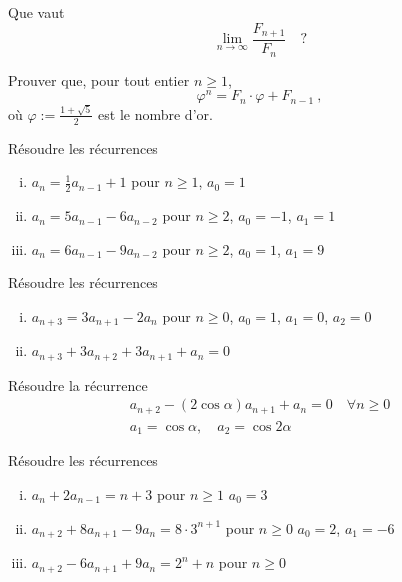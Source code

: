 \begin{exo} 
Que vaut
$$
\lim_{n \to \infty} \frac{F_{n+1}}{F_n} \quad ?
$$
\end{exo}

\begin{exo} 
Prouver que, pour tout entier $n \geqslant 1$, 
$$
\varphi^n = F_n \cdot \varphi + F_{n-1}\ ,
$$
o\`u $\varphi := \frac{1+\sqrt{5}}{2}$ est le {\DEF nombre d'or}.
\end{exo}

\begin{exo}
R\'esoudre les r\'ecurrences 
%
\begin{enumerate}[(i)]
\item $a_n = \frac{1}{2} a_{n-1} + 1$ pour $n \geqslant 1$,\hfill
 $a_0 = 1$

\item $a_n = 5a_{n-1} - 6a_{n-2}$ pour $n \geqslant 2$,\hfill
 $a_0 = -1$, \quad $a_1 = 1$

\item $a_n = 6a_{n-1} - 9a_{n-2}$ pour $n \geqslant 2$,\hfill
 $a_0 = 1$, \quad $a_1 = 9$

\end{enumerate}
\end{exo}

\begin{exo}
R\'esoudre les r\'ecurrences 
%
\begin{enumerate}[(i)]

\item $a_{n+3} = 3 a_{n+1} - 2 a_{n}$ pour $n \geqslant 0$,\hfill
      $a_0 = 1$, \quad $a_1 = 0$, \quad $a_2 = 0$
      
\item $a_{n+3} + 3 a_{n+2} + 3 a_{n+1} + a_n = 0$

\end{enumerate}
\end{exo}

\begin{exo}
R\'esoudre la r\'ecurrence
$$
\begin{array}{ll}
a_{n+2} - (2 \cos \alpha) a_{n+1} + a_n = 0\quad \forall n \geqslant 0\\
a_1 = \cos \alpha, \quad a_2 = \cos 2 \alpha
\end{array}
$$
\end{exo}

\begin{exo}
R\'esoudre les r\'ecurrences
%
\begin{enumerate}[(i)]
\item $a_n + 2 a_{n-1} = n+3$ pour $n \geqslant 1$\hfill
      $a_0 = 3$
      
\item $a_{n+2} + 8 a_{n+1} - 9 a_{n} = 8 \cdot 3^{n+1}$ pour $n \geqslant 0$\hfill
      $a_0 = 2$, \quad $a_1 = -6$
      
\item $a_{n+2} - 6 a_{n+1} + 9 a_{n} = 2^n + n$ pour $n \geqslant 0$

\end{enumerate}
\end{exo}

